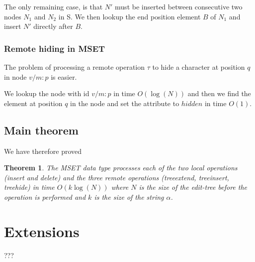 \documentclass{amsart}
\newtheorem{theorem}{Theorem}[section]
\begin{document}
The only remaining case, is that $N'$ must be inserted between consecutive two nodes $N_1$
and $N_2$ in S. We then lookup the end position element $B$ of $N_1$ and insert $N'$ directly after $B$.


\subsubsection{Remote hiding in MSET}
The problem of processing a remote operation $\tau$ to hide 
a character at position $q$ in node $v/m:p$ is easier.

We lookup the node with id $v/m:p$ in time $O(\log(N))$ and
then we find the element at position $q$ in the node
and set the attribute to $hidden$ in time $O(1)$.

\subsection{Main theorem}
We have therefore proved 

\begin{theorem}
The MSET data type processes each of the two local operations (insert and delete) and
the three remote operations (treeextend, treeinsert, treehide) in time $O(k\log(N))$ where $N$ is the size of the edit-tree before the operation is performed and $k$ is the size of the string $\alpha$.
\end{theorem}

\section{Extensions}
???
\end{document}
